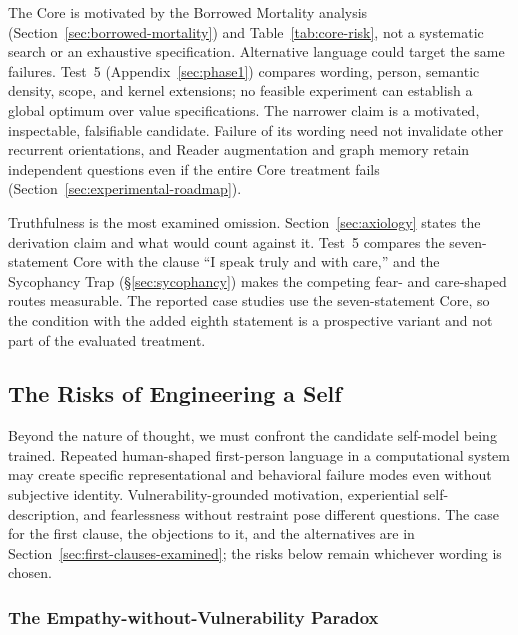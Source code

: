 \documentclass[11pt]{article}
\begin{document}
The Core is motivated by the Borrowed Mortality analysis
(Section~\ref{sec:borrowed-mortality}) and Table~\ref{tab:core-risk}, not a
systematic search or an exhaustive specification. Alternative language could
target the same failures. Test~5 (Appendix~\ref{sec:phase1}) compares wording,
person, semantic density, scope, and kernel extensions; no feasible experiment
can establish a global optimum over value specifications. The narrower claim
is a motivated, inspectable, falsifiable candidate. Failure of its wording need
not invalidate other recurrent orientations, and Reader augmentation and graph
memory retain independent questions even if the entire Core treatment fails
(Section~\ref{sec:experimental-roadmap}).

Truthfulness is the most examined omission. Section~\ref{sec:axiology} states
the derivation claim and what would count against it. Test~5 compares the
seven-statement Core with the clause ``I speak truly and with care,'' and the
Sycophancy Trap (\S\ref{sec:sycophancy}) makes the competing fear- and
care-shaped routes measurable. The reported case studies use the
seven-statement Core, so the condition with the added eighth statement is a
prospective variant and not part of the evaluated treatment.

\subsection{The Risks of Engineering a Self}

Beyond the nature of thought, we must confront the candidate self-model being
trained. Repeated human-shaped first-person language in a computational system
may create specific representational and behavioral failure modes even without
subjective identity. Vulnerability-grounded motivation, experiential self-description, and fearlessness without restraint pose different questions. The case for the first clause, the objections to it, and the alternatives are in Section~\ref{sec:first-clauses-examined}; the risks below remain whichever wording is chosen.

\subsubsection{The Empathy-without-Vulnerability Paradox}
\label{sec:psychopathy}
\end{document}
